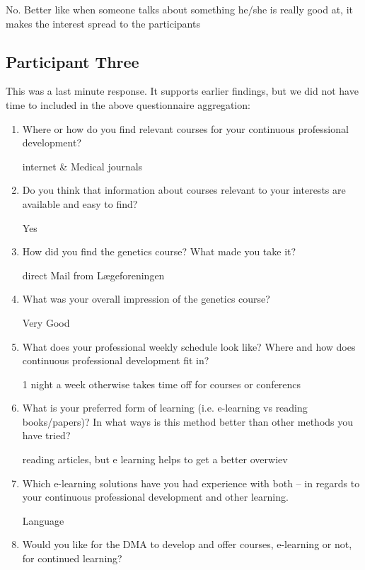\begin{appendices}
\begin{enumerate}
    No. Better like when someone talks about something he/she is really good at, it makes the interest spread to the participants
\end{enumerate}

\subsection{Participant Three}
This was a last minute response. It supports earlier findings, but we did not have time to included in the above questionnaire aggregation:

\begin{enumerate}
    \item Where or how do you find relevant courses for your continuous professional development?

internet \& Medical journals

\item Do you think that information about courses relevant to your interests are available and easy to find?

Yes

\item How did you find the genetics course? What made you take it?

direct Mail from Lægeforeningen

\item What was your overall impression of the genetics course?

Very Good

\item What does your professional weekly schedule look like? Where and how does continuous professional development fit in?

1 night a week otherwise takes time off for courses or conferencs

\item What is your preferred form of learning (i.e. e-learning vs reading books/papers)? In what ways is this method better than other methods you have tried?

reading articles, but e learning helps to get a better overwiev

\item Which e-learning solutions have you had experience with both -- in regards to your continuous professional development and other learning.

Language

\item Would you like for the DMA to develop and offer courses, e-learning or not, for continued learning?


\end{enumerate}
\end{appendices}
